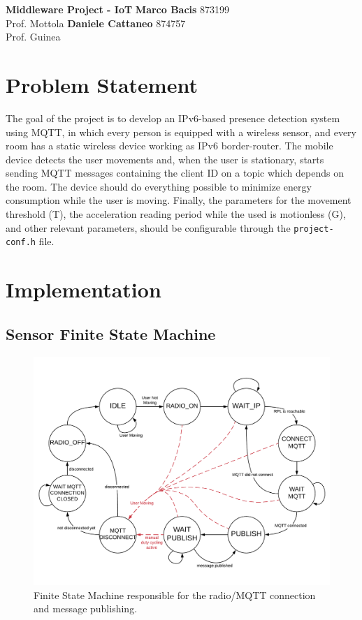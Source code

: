\documentclass[a4paper, 10pt]{article}
\begin{document}
\noindent
\large\textbf{Middleware Project - IoT} \hfill \textbf{Marco Bacis} 873199 \\
Prof. Mottola \hfill \textbf{Daniele Cattaneo} 874757 \\
Prof. Guinea

\section*{Problem Statement}

The goal of the project is to develop an IPv6-based presence detection system using MQTT, in which every person is equipped with a wireless sensor, and every room has a static wireless device working as IPv6 border-router.
The mobile device detects the user movements and, when the user is stationary, starts sending MQTT messages containing the client ID on a topic which depends on the room.
The device should do everything possible to minimize energy consumption while the user is moving.
Finally, the parameters for the movement threshold (T), the acceleration reading period while the used is motionless (G), and other relevant parameters, should be configurable through the \texttt{project-conf.h} file.

\section*{Implementation}

\subsection*{Sensor Finite State Machine}

\begin{figure}[h]
\centering
    \includegraphics[width=\linewidth]{images/fsm.pdf}
    \caption{Finite State Machine responsible for the radio/MQTT connection and message publishing.}
    \label{fig:sensor_fsm}
\end{figure}
\end{document}
